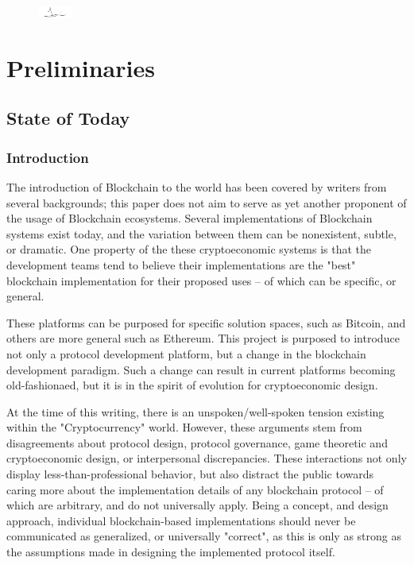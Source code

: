 \documentclass[12pt, titlepage, twocolumn]{report}
\begin{document}
\begin{figure}[ht]
	\begin{flushright}
		\includegraphics[width=0.10\textwidth]{signature.png}	
	\end{flushright}
\end{figure}

\clearpage
\onecolumn


\part{Preliminaries}
\chapter{State of Today}

\section{Introduction}
The introduction of Blockchain to the world has been covered by writers from several backgrounds; this paper does not aim to serve as yet another proponent of the usage of Blockchain ecosystems. Several implementations of Blockchain systems exist today, and the variation between them can be nonexistent, subtle, or dramatic. One property of the these cryptoeconomic systems is that the development teams tend to believe their implementations are the "best" blockchain implementation for their proposed uses -- of which can be specific, or general. 

These platforms can be purposed for specific solution spaces, such as Bitcoin, and others are more general such as Ethereum. This project is purposed to introduce not only a protocol development platform, but a change in the blockchain development paradigm. Such a change can result in current platforms becoming old-fashionaed, but it is in the spirit of evolution for cryptoeconomic design.

At the time of this writing, there is an unspoken/well-spoken tension existing within the "Cryptocurrency" world. However, these arguments stem from disagreements about protocol design, protocol governance, game theoretic and cryptoeconomic design, or interpersonal discrepancies. These interactions not only display less-than-professional behavior, but also distract the public towards caring more about the implementation details of any blockchain protocol -- of which are arbitrary, and do not universally apply. Being a concept, and design approach, individual blockchain-based implementations should never be communicated as generalized, or universally "correct", as this is only as strong as the assumptions made in designing the implemented protocol itself.
\end{document}
